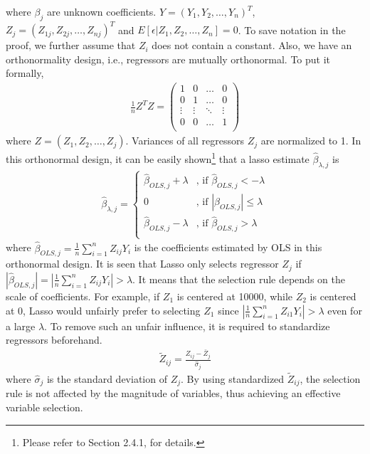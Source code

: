         where $\beta_j$ are unknown coefficients. $Y=(Y_1, Y_2, \ldots, Y_n)^T$, $Z_j=(Z_{1j}, Z_{2j}, \ldots, Z_{nj})^{T}$ and $E[\epsilon|Z_1, Z_2, \ldots, Z_n]=0$. To save notation in the proof, we further assume that $Z_i$ does not contain a constant. Also, we have an orthonormality design, i.e., regressors are mutually orthonormal. To put it formally,
        \begin{align*}
            \frac{1}{n}Z^TZ=
            \begin{pmatrix}
                1 & 0 & \ldots & 0 \\
                0 & 1 & \ldots & 0 \\
                \vdots & \vdots & \ddots & \vdots \\
                0 & 0 & \ldots & 1 \\
            \end{pmatrix}
        \end{align*}
        where $Z=(Z_1,Z_2, \ldots, Z_j)$. Variances of all regressors $Z_j$ are normalized to 1. In this orthonormal design, it can be easily shown\footnote{Please refer to Section 2.4.1, \cite{Hastie_Tibshirani_Wainwright_2015} for details.} that a lasso estimate $\hat{\beta}_{\lambda, j}$ is
        \begin{align*}
            \hat{\beta}_{\lambda, j}=
            \begin{cases}
                \hat{\beta}_{OLS, j} + \lambda & \text{, if $\hat{\beta}_{OLS, j} < -\lambda$}\\
                0 & \text{, if $|\hat{\beta}_{OLS, j}| \le \lambda$}\\
                \hat{\beta}_{OLS, j} - \lambda & \text{, if $\hat{\beta}_{OLS, j} > \lambda$}\\
            \end{cases}
        \end{align*}
        where $\hat{\beta}_{OLS, j}=\frac{1}{n}\sum_{i=1}^n Z_{ij}Y_i$ is the coefficients estimated by OLS in this orthonormal design. It is seen that Lasso only selects regressor $Z_j$ if $|\hat{\beta}_{OLS, j}|=|\frac{1}{n}\sum_{i=1}^n Z_{ij}Y_i|>\lambda$. It means that the selection rule depends on the scale of coefficients. For example, if $Z_{1}$ is centered at 10000, while $Z_{2}$ is centered at 0, Lasso would unfairly prefer to selecting $Z_{1}$ since $|\frac{1}{n}\sum_{i=1}^n Z_{i1}Y_i|>\lambda$ even for a large $\lambda$. To remove such an unfair influence, it is required to standardize regressors beforehand.
        \begin{align*}
            \tilde{Z}_{ij}=\frac{Z_{ij}-\bar{Z}_j}{\hat{\sigma}_j}
        \end{align*}
        where $\hat{\sigma}_j$ is the standard deviation of $Z_j$. By using standardized $\tilde{Z}_{ij}$, the selection rule is not affected by the magnitude of variables, thus achieving an effective variable selection.
        



